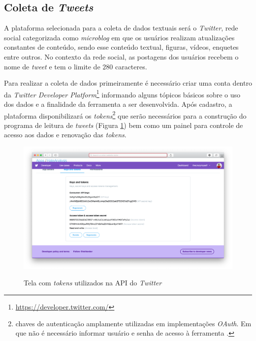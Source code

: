 \subsection{Coleta de \textit{Tweets}}
\label{subsec:coletatweets}
A plataforma selecionada para a coleta de dados textuais será o \textit{Twitter}, rede social categorizada como \textit{microblog} em que os usuários realizam atualizações constantes de conteúdo, sendo esse conteúdo textual, figuras, vídeos, enquetes entre outros. No contexto da rede social, as postagens dos usuários recebem o nome de \textit{tweet} e tem o limite de $280$ caracteres.


Para realizar a coleta de dados primeiramente é necessário criar uma conta dentro da \textit{Twitter Developer Platform}\footnote{\url{https://developer.twitter.com/}} informando alguns tópicos básicos sobre o uso dos dados e a finalidade da ferramenta a ser desenvolvida. Após cadastro, a plataforma disponibilizará os \textit{tokens}\footnote{chaves de autenticação amplamente utilizadas em implementações \textit{OAuth}. Em que não é necessário informar usuário e senha de acesso à ferramenta \cite{hardt2012oauth}.} que serão necessários para a construção do programa de leitura de \textit{tweets} (Figura \ref{fig:twitterdeveloperplatform}) bem como um painel para controle de acesso aos dados e renovação das \textit{tokens}.

\begin{figure}[!h]
\centering 
\caption{Tela com \textit{tokens} utilizados na API do \textit{Twitter}}
\includegraphics[scale=0.3]{imagens/twitterdeveloperplatform.png}
\label{fig:twitterdeveloperplatform}
\end{figure}

